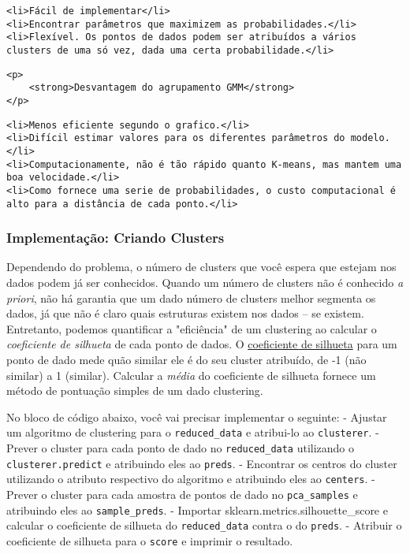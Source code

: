 \documentclass[11pt]{article}
\begin{document}
\begin{verbatim}
<li>Fácil de implementar</li>
<li>Encontrar parâmetros que maximizem as probabilidades.</li>
<li>Flexível. Os pontos de dados podem ser atribuídos a vários clusters de uma só vez, dada uma certa probabilidade.</li>
\end{verbatim}

\begin{verbatim}
<p>
    <strong>Desvantagem do agrupamento GMM</strong>
</p>
\end{verbatim}

\begin{verbatim}
<li>Menos eficiente segundo o grafico.</li>
<li>Difícil estimar valores para os diferentes parâmetros do modelo.</li>
<li>Computacionamente, não é tão rápido quanto K-means, mas mantem uma boa velocidade.</li>
<li>Como fornece uma serie de probabilidades, o custo computacional é alto para a distância de cada ponto.</li>
\end{verbatim}

    \subsubsection{Implementação: Criando
Clusters}\label{implementauxe7uxe3o-criando-clusters}

Dependendo do problema, o número de clusters que você espera que estejam
nos dados podem já ser conhecidos. Quando um número de clusters não é
conhecido \emph{a priori}, não há garantia que um dado número de
clusters melhor segmenta os dados, já que não é claro quais estruturas
existem nos dados -- se existem. Entretanto, podemos quantificar a
"eficiência" de um clustering ao calcular o \emph{coeficiente de
silhueta} de cada ponto de dados. O
\href{http://scikit-learn.org/stable/modules/generated/sklearn.metrics.silhouette_score.html}{coeficiente
de silhueta} para um ponto de dado mede quão similar ele é do seu
cluster atribuído, de -1 (não similar) a 1 (similar). Calcular a
\emph{média} do coeficiente de silhueta fornece um método de pontuação
simples de um dado clustering.

No bloco de código abaixo, você vai precisar implementar o seguinte: -
Ajustar um algoritmo de clustering para o \texttt{reduced\_data} e
atribui-lo ao \texttt{clusterer}. - Prever o cluster para cada ponto de
dado no \texttt{reduced\_data} utilizando o \texttt{clusterer.predict} e
atribuindo eles ao \texttt{preds}. - Encontrar os centros do cluster
utilizando o atributo respectivo do algoritmo e atribuindo eles ao
\texttt{centers}. - Prever o cluster para cada amostra de pontos de dado
no \texttt{pca\_samples} e atribuindo eles ao \texttt{sample\_preds}. -
Importar sklearn.metrics.silhouette\_score e calcular o coeficiente de
silhueta do \texttt{reduced\_data} contra o do \texttt{preds}. -
Atribuir o coeficiente de silhueta para o \texttt{score} e imprimir o
resultado.
\end{document}
